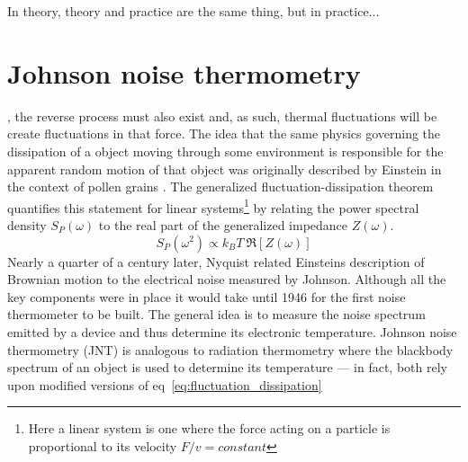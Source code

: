 \begin{savequote}[75mm]
In theory, theory and practice are the same thing, but in practice...
\end{savequote}

\chapter{Johnson noise thermometry}
\label{ch:johnson_noise_thermometry}

, the reverse process must also exist and, as such, thermal fluctuations will be create fluctuations in that force. The idea that the same physics governing the dissipation of a object moving through some environment is responsible for the apparent random motion of that object was originally described by Einstein in the context of pollen grains \cite{einstein_investigations_2011}. The generalized fluctuation-dissipation theorem\cite{kubo_fluctuation-dissipation_1966} quantifies this statement for linear systems\footnote{Here a linear system is one where the force acting on a particle is proportional to its velocity $F/v = constant$} by relating the power spectral density $S_P(\omega)$ to the real part of the generalized impedance $Z(\omega)$\cite{callen_irreversibility_1951}.
\begin{equation}\label{eq:fluctuation_dissipation}
S_P(\omega^2) \propto k_BT\ \Re[Z(\omega)]
\end{equation}
Nearly a quarter of a century later, Nyquist\cite{nyquist_thermal_1928} related Einsteins description of Brownian motion to the electrical noise measured by Johnson\cite{johnson_thermal_1927,johnson_thermal_1928}. Although all the key components were in place it would take until 1946 for the first noise thermometer to be built\cite{dicke_measurement_1946}. The general idea is to measure the noise spectrum emitted by a device and thus determine its electronic temperature. Johnson noise thermometry (JNT) is analogous to radiation thermometry where the blackbody spectrum of an object is used to determine its temperature --- in fact, both rely upon modified versions of eq~\ref{eq:fluctuation_dissipation}

